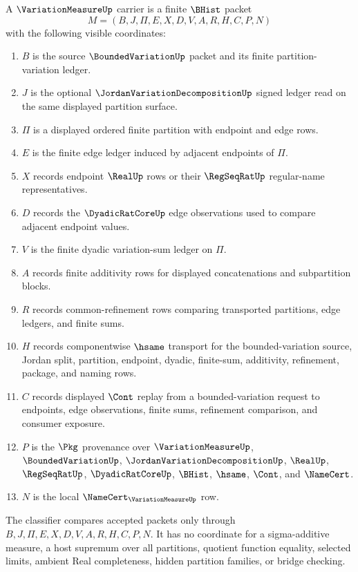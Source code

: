 \begin{definition}
\label{def:variation-measure-finite-partition-carrier}
A $\VariationMeasureUp$ carrier is a finite $\BHist$ packet
$$
M=(B,J,\Pi,E,X,D,V,A,R,H,C,P,N)
$$
with the following visible coordinates:
\begin{enumerate}
\item $B$ is the source $\BoundedVariationUp$ packet and its finite partition-variation ledger.
\item $J$ is the optional $\JordanVariationDecompositionUp$ signed ledger read on the same displayed partition surface.
\item $\Pi$ is a displayed ordered finite partition with endpoint and edge rows.
\item $E$ is the finite edge ledger induced by adjacent endpoints of $\Pi$.
\item $X$ records endpoint $\RealUp$ rows or their $\RegSeqRatUp$ regular-name representatives.
\item $D$ records the $\DyadicRatCoreUp$ edge observations used to compare adjacent endpoint values.
\item $V$ is the finite dyadic variation-sum ledger on $\Pi$.
\item $A$ records finite additivity rows for displayed concatenations and subpartition blocks.
\item $R$ records common-refinement rows comparing transported partitions, edge ledgers, and finite sums.
\item $H$ records componentwise $\hsame$ transport for the bounded-variation source, Jordan split, partition, endpoint, dyadic, finite-sum, additivity, refinement, package, and naming rows.
\item $C$ records displayed $\Cont$ replay from a bounded-variation request to endpoints, edge observations, finite sums, refinement comparison, and consumer exposure.
\item $P$ is the $\Pkg$ provenance over $\VariationMeasureUp$, $\BoundedVariationUp$, $\JordanVariationDecompositionUp$, $\RealUp$, $\RegSeqRatUp$, $\DyadicRatCoreUp$, $\BHist$, $\hsame$, $\Cont$, and $\NameCert$.
\item $N$ is the local $\NameCert_{\VariationMeasureUp}$ row.
\end{enumerate}
The classifier compares accepted packets only through $B,J,\Pi,E,X,D,V,A,R,H,C,P,N$. It has no coordinate for a sigma-additive measure, a host supremum over all partitions, quotient function equality, selected limits, ambient Real completeness, hidden partition families, or bridge checking.
\end{definition}

